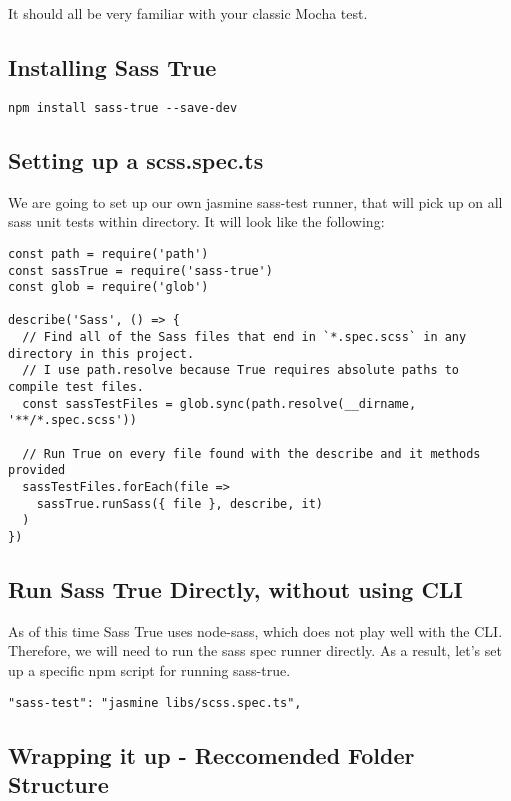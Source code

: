 It should all be very familiar with your classic Mocha test.

\subsection{ Installing Sass True }
\begin{verbatim}
npm install sass-true --save-dev
\end{verbatim}

\subsection{ Setting up a scss.spec.ts }
We are going to set up our own jasmine sass-test runner, that will pick up on
all sass unit tests within directory. It will look like the following:
\begin{lstlisting}
const path = require('path')
const sassTrue = require('sass-true')
const glob = require('glob')

describe('Sass', () => {
  // Find all of the Sass files that end in `*.spec.scss` in any directory in this project.
  // I use path.resolve because True requires absolute paths to compile test files.
  const sassTestFiles = glob.sync(path.resolve(__dirname, '**/*.spec.scss'))

  // Run True on every file found with the describe and it methods provided
  sassTestFiles.forEach(file =>
    sassTrue.runSass({ file }, describe, it)
  )
})
\end{lstlisting}

\subsection{ Run Sass True Directly, without using CLI }
As of this time Sass True uses node-sass, which does not play well with the CLI.
Therefore, we will need to run the sass spec runner directly. As a result,
let's set up a specific npm script for running sass-true.
\begin{verbatim}
"sass-test": "jasmine libs/scss.spec.ts",
\end{verbatim}

\subsection{ Wrapping it up - Reccomended Folder Structure }

